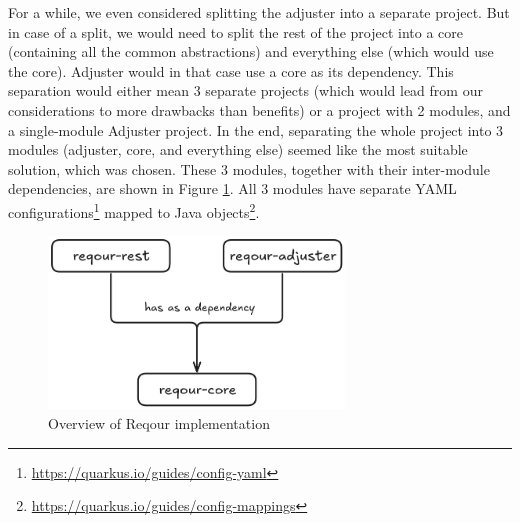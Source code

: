 \documentclass[../main.tex]{subfiles}
\begin{document}
For a while, we even considered splitting the adjuster into a separate project. But in case of a split, we would need to split the rest of the project into a core (containing all the common abstractions) and everything else (which would use the core). Adjuster would in that case use a core as its dependency. This separation would either mean 3 separate projects (which would lead from our considerations to more drawbacks than benefits) or a project with 2 modules, and a single-module Adjuster project. In the end, separating the whole project into 3 modules (adjuster, core, and everything else) seemed like the most suitable solution, which was chosen. These 3 modules, together with their inter-module dependencies, are shown in Figure \ref{fig:reqour-modules}. All 3 modules have separate YAML configurations\footnote{\url{https://quarkus.io/guides/config-yaml}} mapped to Java objects\footnote{\url{https://quarkus.io/guides/config-mappings}}.

\begin{figure}
  \begin{center}
    \includegraphics[width=0.7\textwidth]{images/reqour-modules.png}
  \end{center}
  \caption{Overview of Reqour implementation}
  \label{fig:reqour-modules}
\end{figure}
\end{document}
